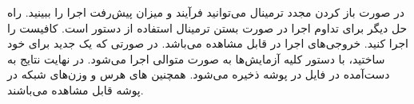 در صورت باز کردن مجدد ترمینال می‌توانید فرآیند و میزان پیش‌رفت اجرا را ببینید.
راه حل دیگر برای تداوم اجرا در صورت بستن ترمینال استفاده از دستور 
است. کافیست
را اجرا کنید. خروجی‌های اجرا در 
قابل مشاهده می‌باشد.
\newline
در صورتی که یک
جدید برای خود ساختید، با دستور
کلیه آزمایش‌ها به صورت متوالی اجرا می‌شود. در نهایت نتایج به دست‌آمده در فایل
در پوشه 
ذخیره می‌شود. همچنین
های هرس و وزن‌های شبکه در پوشه
قابل مشاهده می‌باشند. 











